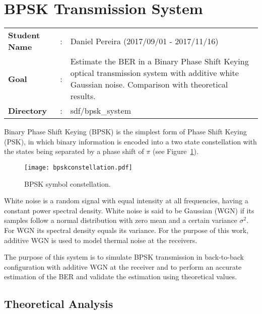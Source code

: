\clearpage
\section{BPSK Transmission System}

\begin{tcolorbox}	
\begin{tabular}{p{2.75cm} p{0.2cm} p{10.5cm}} 	
\textbf{Student Name}  &:& Daniel Pereira (2017/09/01 - 2017/11/16)\\
\textbf{Goal}          &:& Estimate the BER in a Binary Phase Shift Keying optical transmission system with additive white Gaussian noise. Comparison with theoretical results.\\
\textbf{Directory}              &:& sdf/bpsk\_system  
\end{tabular}
\end{tcolorbox}

Binary Phase Shift Keying (BPSK) is the simplest form of Phase Shift Keying (PSK), in which binary information is encoded into a two state constellation with the states being separated by a phase shift of $\pi$ (see Figure~\ref{fig:BPSKConst}).

\begin{figure}[h]
\centering
\texttt{[image: bpskconstellation.pdf]}
\caption{BPSK symbol constellation.}
\label{fig:BPSKConst}
\end{figure}

\par
White noise is a random signal with equal intensity at all frequencies, having a constant power spectral density. White noise is said to be Gaussian (WGN) if its samples follow a normal distribution with zero mean and a certain variance $\sigma^2$. For WGN its spectral density equals its variance. For the purpose of this work, additive WGN is used to model thermal noise at the receivers.
\par
The purpose of this system is to simulate BPSK transmission in back-to-back configuration with additive WGN at the receiver and to perform an accurate estimation of the BER and validate the estimation using theoretical values.

\subsection{Theoretical Analysis}

